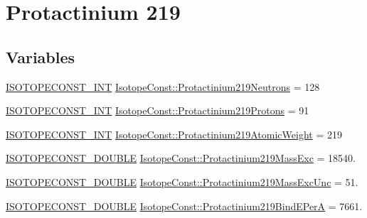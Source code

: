 \hypertarget{group___isotope_const-_protactinium-_pa219}{}\section{Protactinium 219}
\label{group___isotope_const-_protactinium-_pa219}
\subsection*{Variables}
\begin{DoxyCompactItemize}
\item 
\mbox{\hyperlink{group___isotope_const-_macros_ga5f18360b3e99483a35c32d789e62621c}{I\+S\+O\+T\+O\+P\+E\+C\+O\+N\+S\+T\+\_\+\+I\+NT}} \mbox{\hyperlink{group___isotope_const-_protactinium-_pa219_gae17ed0a9dd46cbaa41c610d4b214b553}{Isotope\+Const\+::\+Protactinium219\+Neutrons}} = 128
\item 
\mbox{\hyperlink{group___isotope_const-_macros_ga5f18360b3e99483a35c32d789e62621c}{I\+S\+O\+T\+O\+P\+E\+C\+O\+N\+S\+T\+\_\+\+I\+NT}} \mbox{\hyperlink{group___isotope_const-_protactinium-_pa219_ga3a279025bce626905e2b693907395785}{Isotope\+Const\+::\+Protactinium219\+Protons}} = 91
\item 
\mbox{\hyperlink{group___isotope_const-_macros_ga5f18360b3e99483a35c32d789e62621c}{I\+S\+O\+T\+O\+P\+E\+C\+O\+N\+S\+T\+\_\+\+I\+NT}} \mbox{\hyperlink{group___isotope_const-_protactinium-_pa219_ga8e26353dba5f7053a903b0a6f184557c}{Isotope\+Const\+::\+Protactinium219\+Atomic\+Weight}} = 219
\item 
\mbox{\hyperlink{group___isotope_const-_macros_ga8f45a7272ce02c0b4c65c44636ed719a}{I\+S\+O\+T\+O\+P\+E\+C\+O\+N\+S\+T\+\_\+\+D\+O\+U\+B\+LE}} \mbox{\hyperlink{group___isotope_const-_protactinium-_pa219_ga9656e92b59566980d2434fc4c978503e}{Isotope\+Const\+::\+Protactinium219\+Mass\+Exc}} = 18540.
\item 
\mbox{\hyperlink{group___isotope_const-_macros_ga8f45a7272ce02c0b4c65c44636ed719a}{I\+S\+O\+T\+O\+P\+E\+C\+O\+N\+S\+T\+\_\+\+D\+O\+U\+B\+LE}} \mbox{\hyperlink{group___isotope_const-_protactinium-_pa219_ga070381417923fa8e6ca62cb45ee5d28f}{Isotope\+Const\+::\+Protactinium219\+Mass\+Exc\+Unc}} = 51.
\item 
\mbox{\hyperlink{group___isotope_const-_macros_ga8f45a7272ce02c0b4c65c44636ed719a}{I\+S\+O\+T\+O\+P\+E\+C\+O\+N\+S\+T\+\_\+\+D\+O\+U\+B\+LE}} \mbox{\hyperlink{group___isotope_const-_protactinium-_pa219_ga4aac4f84506e01b51272e010e184b018}{Isotope\+Const\+::\+Protactinium219\+Bind\+E\+PerA}} = 7661.

\end{DoxyCompactItemize}
